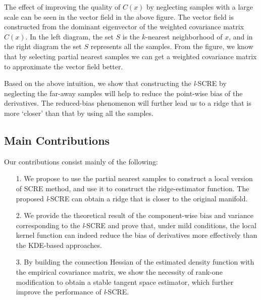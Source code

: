 \documentclass[aos,preprint]{imsart}
\theoremstyle{remark}
\begin{document}
The effect of improving the quality of $C(x)$ by neglecting samples with a large scale can be seen in the vector field in the above figure. The vector field is constructed from the dominant eigenvector of the weighted covariance matrix $C(x)$. In the left diagram, the set $S$ is the $k$-nearest neighborhood of $x$, and in the right diagram the set $S$ represents all the samples. From the figure, we know that by selecting partial nearest samples we can get a weighted covariance matrix to approximate the vector field better.

Based on the above intuition, we show that constructing the {\it l}-SCRE by neglecting the far-away samples will help to reduce the point-wise bias of the derivatives. The reduced-bias phenomenon will further lead us to a ridge that is more `closer' than that by using all the samples.
 \subsection{Main Contributions}
Our contributions consist mainly of the following:
\begin{itemize}
\item[1.] We propose to use the partial nearest samples to construct a local version of SCRE method, and use it to construct the ridge-estimator function. The proposed {\it l}-SCRE  can obtain a ridge that is closer to the original manifold.
\item[2.] We provide the theoretical result of the component-wise bias and variance corresponding to the {\it l}-SCRE and prove that, under mild conditions, the local kernel function can indeed reduce the bias of derivatives more effectively than the KDE-based approaches.
\item[3.] By building the connection Hessian of the estimated density function with the empirical covariance matrix, we show the necessity of rank-one modification to obtain a stable tangent space estimator, which further improve the performance of {\it l}-SCRE.
\end{itemize}
\end{document}
